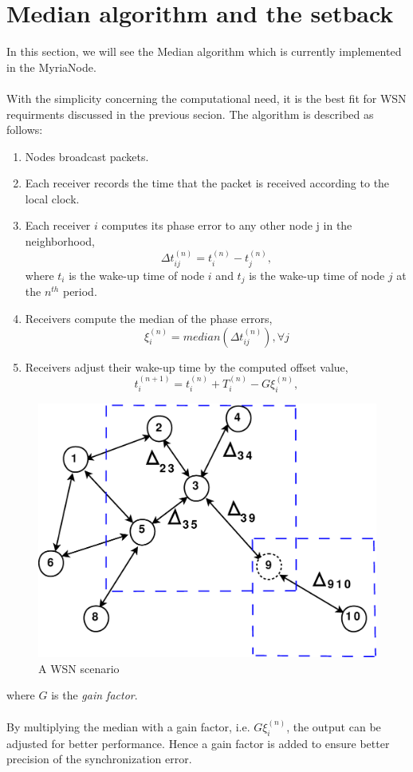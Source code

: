 \documentclass[a4paper,10pt]{report}
\begin{document}
\section{\textbf{Median algorithm and the setback}} In this section, we will see the Median algorithm which is
currently implemented in the MyriaNode. \paragraph*{}
With the simplicity concerning the computational need, it is the best fit for WSN requirments discussed in the previous secion. The algorithm is described as follows:
\begin{enumerate}
\item Nodes broadcast packets.
\item Each receiver records the time that the packet is received according to the local clock.
\item Each receiver $i$ computes its phase error to any other node j in the neighborhood,
\begin{equation}
\Delta t_{ij}^{(n)} = t_i^{(n)} - t_j^{(n)} ,
\end{equation}
where $t_i$ is the wake-up time of node $i$ and $t_j$ is the wake-up
time of node $j$ at the $n^{th}$ period.
\item Receivers compute the median of the phase errors,
\begin{equation}
\xi_i^{(n)} = median(\Delta t_{ij}^{(n)}) , \forall j
\end{equation}
\item Receivers adjust their wake-up time by the computed offset value,
\begin{equation}
t_{i}^{(n+1)} = t_i^{(n)} + T_i^{(n)} - G\xi_i^{(n)},
\end{equation}
\end{enumerate}
\begin{figure}
\centering
\includegraphics[width=0.6 \textwidth]{node_field}
\caption{A WSN scenario} \label{wsn}
\end{figure}
where $G$ is the \textit{gain factor}. \paragraph*{}
By multiplying the median with a gain factor, i.e. $G\xi_i^{(n)}$, the output can be adjusted for better performance. Hence a gain factor is added to ensure better precision of the synchronization error.
\end{document}

